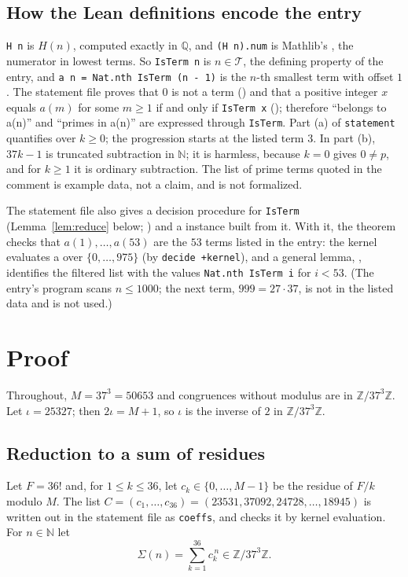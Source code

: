 \documentclass[11pt]{amsart}
\theoremstyle{plain}
\theoremstyle{definition}
\newcommand{\code}[1]{\texttt{#1}}
\newcommand{\N}{\mathbb{N}}
\newcommand{\Z}{\mathbb{Z}}
\newcommand{\Q}{\mathbb{Q}}
\newcommand{\Term}{\mathcal{T}}
\newcommand{\Zm}{\Z/37^3\Z}
\begin{document}
\subsection*{How the Lean definitions encode the entry}
\code{H n} is $H(n)$, computed exactly in $\Q$, and \code{(H n).num} is Mathlib's , the numerator in lowest terms. So \code{IsTerm n} is $n\in\Term$, the defining property of the entry, and \code{a n = Nat.nth IsTerm (n - 1)} is the $n$-th smallest term with offset $1$. The statement file proves that $0$ is not a term () and that a positive integer $x$ equals $a(m)$ for some $m\ge1$ if and only if \code{IsTerm x} (); therefore ``belongs to a(n)'' and ``primes in a(n)'' are expressed through \code{IsTerm}. Part (a) of \code{statement} quantifies over $k\ge0$; the progression starts at the listed term $3$. In part (b), $37k-1$ is truncated subtraction in $\N$; it is harmless, because $k=0$ gives $0\ne p$, and for $k\ge1$ it is ordinary subtraction. The list of prime terms quoted in the comment is example data, not a claim, and is not formalized.

The statement file also gives a decision procedure for \code{IsTerm} (Lemma~\ref{lem:reduce} below; ) and a  instance built from it. With it, the theorem  checks that $a(1),\dots,a(53)$ are the $53$ terms listed in the entry: the kernel evaluates a  over $\{0,\dots,975\}$ (by \texttt{decide +kernel}), and a general lemma, , identifies the filtered list with the values \code{Nat.nth IsTerm i} for $i<53$. (The entry's program scans $n\le1000$; the next term, $999=27\cdot37$, is not in the listed data and is not used.)

\section{Proof}\label{sec:proof}

Throughout, $M=37^3=50653$ and congruences without modulus are in $\Zm$. Let $\iota=25327$; then $2\iota=M+1$, so $\iota$ is the inverse of $2$ in $\Zm$.

\subsection{Reduction to a sum of residues}
Let $F=36!$ and, for $1\le k\le36$, let $c_k\in\{0,\dots,M-1\}$ be the residue of $F/k$ modulo $M$. The list $C=(c_1,\dots,c_{36})=(23531,37092,24728,\dots,18945)$ is written out in the statement file as \code{coeffs}, and  checks it by kernel evaluation. For $n\in\N$ let
\[
  \Sigma(n)=\sum_{k=1}^{36}c_k^{\,n}\in\Zm.
\]
\end{document}

